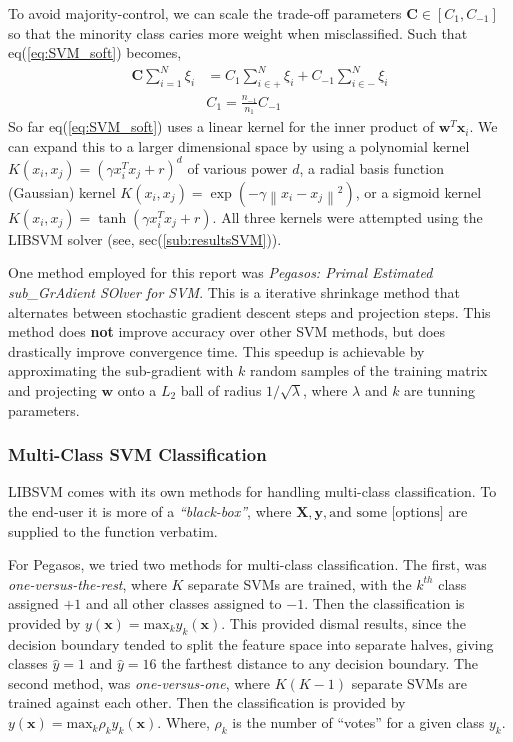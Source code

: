 \documentclass[fleqn]{article}
\begin{document}
%
To avoid majority-control, we can scale the trade-off parameters $\mathbf{C} \in [C_{1}, C_{-1}]$ so that the minority class caries more weight when misclassified. Such that eq(\ref{eq:SVM_soft}) becomes,
%
\begin{equation}
\label{eq:scaledC}
\begin{aligned}
	\mathbf{C} \sum_{i=1}^N \xi_i &= C_1 \sum_{i \in +}^N \xi_i + C_{-1} \sum_{i \in -}^N \xi_i\\
	& C_1 = \frac{n_{-1}}{n_{1}} C_{-1}
\end{aligned}
\end{equation}
%
So far eq(\ref{eq:SVM_soft}) uses a linear kernel for the inner product of $\mathbf{w}^T \mathbf{x}_i$.  We can expand this to a larger dimensional space by using a polynomial kernel $K(x_i , x_j) = (\gamma x_i^T x_j + r)^d$ of various power $d$, a radial basis function (Gaussian) kernel $K(x_i , x_j) = \exp(-\gamma \left\|x_i - x_j\right\|^2)$, or a sigmoid kernel $K(x_i , x_j) = \tanh(\gamma x_i^T x_j + r)$.  All three kernels were attempted using the LIBSVM solver\cite{LIBSVM} (see, sec(\ref{sub:resultsSVM})).

One method employed for this report was \textit{Pegasos: Primal Estimated sub\_GrAdient SOlver for SVM}\cite{Shwartz:2007}.  This is a iterative shrinkage method that alternates between stochastic gradient descent steps and projection steps.  This method does \textbf{not} improve accuracy over other SVM methods, but does drastically improve convergence time.  This speedup is achievable by approximating the sub-gradient with $k$ random samples of the training matrix and projecting $\mathbf{w}$ onto a $L_2$ ball of radius $1/\sqrt{\lambda}$, where $\lambda$ and $k$ are tunning parameters.      

\subsubsection{Multi-Class SVM Classification}
\label{sub:multiSVM}
LIBSVM comes with its own methods for handling multi-class classification.  To the end-user it is more of a \textit{``black-box''}, where $\mathbf{X}, \mathbf{y}, \text{and some [options]}$ are supplied to the function verbatim.  

For Pegasos, we tried two methods for multi-class classification.  The first, was \textit{one-versus-the-rest}\cite{vapnik:1998}, where $K$ separate SVMs are trained, with the $k^{th}$ class assigned $+1$ and all other classes assigned to $-1$.  Then the classification is provided by $y(\mathbf{x}) = \text{max}_k y_k (\mathbf{x})$.  This provided dismal results, since the decision boundary tended to split the feature space into separate halves, giving classes $\widehat{y} = 1$ and $\widehat{y} = 16$ the farthest distance to any decision boundary. The second method, was \textit{one-versus-one}\cite{vapnik:1998}, where $K(K-1)$ separate SVMs are trained against each other.  Then the classification is provided by $y(\mathbf{x}) = \text{max}_k \rho_k y_k (\mathbf{x})$.  Where, $\rho_k$ is the number of ``votes'' for a given class $y_k$.
\end{document}

